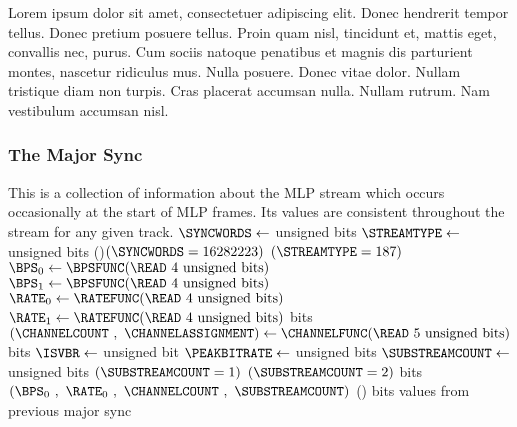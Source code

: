 \clearpage

Lorem ipsum dolor sit amet, consectetuer adipiscing elit. Donec hendrerit tempor tellus. Donec pretium posuere tellus. Proin quam nisl, tincidunt et, mattis eget, convallis nec, purus. Cum sociis natoque penatibus et magnis dis parturient montes, nascetur ridiculus mus. Nulla posuere. Donec vitae dolor. Nullam tristique diam non turpis. Cras placerat accumsan nulla. Nullam rutrum. Nam vestibulum accumsan nisl.



\clearpage

\subsubsection{The Major Sync}
This is a collection of information about the MLP stream
which occurs occasionally at the start of MLP frames.
Its values are consistent throughout the stream for any given track.
{
$\SYNCWORDS \leftarrow$  unsigned bits\;
$\STREAMTYPE \leftarrow$  unsigned bits\;
\eIf(){$(\SYNCWORDS = 16282223)$ \AND $(\STREAMTYPE = 187)$}{
  $\text{\BPS}_0 \leftarrow \BPSFUNC(\text{\READ 4 unsigned bits})$\;
  $\text{\BPS}_1 \leftarrow \BPSFUNC(\text{\READ 4 unsigned bits})$\;
  $\text{\RATE}_0 \leftarrow \RATEFUNC(\text{\READ 4 unsigned bits})$\;
  $\text{\RATE}_1 \leftarrow \RATEFUNC(\text{\READ 4 unsigned bits})$\;
   bits\;
  $(\text{\CHANNELCOUNT}~,~\text{\CHANNELASSIGNMENT}) \leftarrow \CHANNELFUNC(\text{\READ 5 unsigned bits})$\;
   bits\;
  $\text{\ISVBR} \leftarrow$  unsigned bit\;
  $\text{\PEAKBITRATE} \leftarrow$  unsigned bits\;
  $\text{\SUBSTREAMCOUNT} \leftarrow$  unsigned bits\;
  \ASSERT $(\text{\SUBSTREAMCOUNT} = 1)$ \OR $(\text{\SUBSTREAMCOUNT} = 2)$\;
   bits\;
  \Return $(\text{\BPS}_0~,~\text{\RATE}_0~,~\text{\CHANNELCOUNT}~,~\text{\SUBSTREAMCOUNT})$\;
}(){
   bits\;
  \Return values from previous major sync\;
}
\EALGORITHM
}
